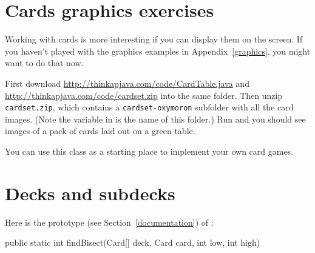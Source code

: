 

\section{Cards graphics exercises}

\begin{exercise}
Working with cards is more interesting if you can display them on the screen.
If you haven't played with the graphics examples in Appendix~\ref{graphics}, you might want to do that now.

First download
\url{http://thinkapjava.com/code/CardTable.java}
and
\url{http://thinkapjava.com/code/cardset.zip} into the same folder.
Then unzip {\tt cardset.zip}, which contains a {\tt cardset-oxymoron}
subfolder with all the card images. (Note the variable 
in  is the name of this folder.)
Run  and you
should see images of a pack of cards laid out on a green table.

You can use this class as a starting place to implement your own
card games.
\end{exercise}



\section{Decks and subdecks}

Here is the prototype (see Section~\ref{documentation}) of :

\begin{code}
public static int findBisect(Card[] deck, Card card, int low, int high)
\end{code}

